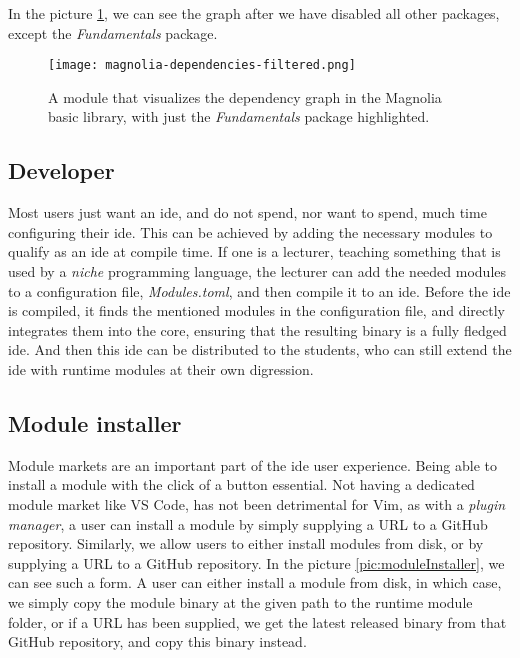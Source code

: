 In the picture \ref{pic:depDis}, we can see the graph after we have disabled all
other packages, except the \textit{Fundamentals} package.

\begin{figure}[H]
  \centering
  \texttt{[image: magnolia-dependencies-filtered.png]}
  \caption{
    A module that visualizes the dependency graph in the Magnolia basic library,
    with just the \textit{Fundamentals} package highlighted.
  }
  \label{pic:depDis}
\end{figure}


\subsection{Developer}

Most users just want an \gls*{ide}, and do not spend, nor want to spend, much
time configuring their \gls*{ide}. This can be achieved by adding the necessary
modules to qualify as an \gls*{ide} at compile time. If one is a lecturer,
teaching something that is used by a \textit{niche} programming language, the
lecturer can add the needed modules to a configuration file,
\textit{Modules.toml}, and then compile it to an \gls*{ide}. Before the \gls*{ide}
is compiled, it finds the mentioned modules in the configuration file, and
directly integrates them into the core, ensuring that the resulting binary is a
fully fledged \gls*{ide}. And then this \gls*{ide} can be distributed to the
students, who can still extend the \gls*{ide} with runtime modules at their own
digression.

\subsection{Module installer}

Module markets are an important part of the \gls*{ide} user experience. Being
able to install a module with the click of a button essential. Not having a
dedicated module market like VS Code, has not been detrimental for
Vim, as with a \textit{plugin manager}, a user can install a module by
simply supplying a URL to a GitHub repository. Similarly, we allow users to
either install modules from disk, or by supplying a URL to a GitHub repository.
In the picture \ref{pic:moduleInstaller}, we can see such a form. A user can
either install a module from disk, in which case, we simply copy the module
binary at the given path to the runtime module folder, or if a URL has been
supplied, we get the latest released binary from that GitHub repository, and
copy this binary instead.

